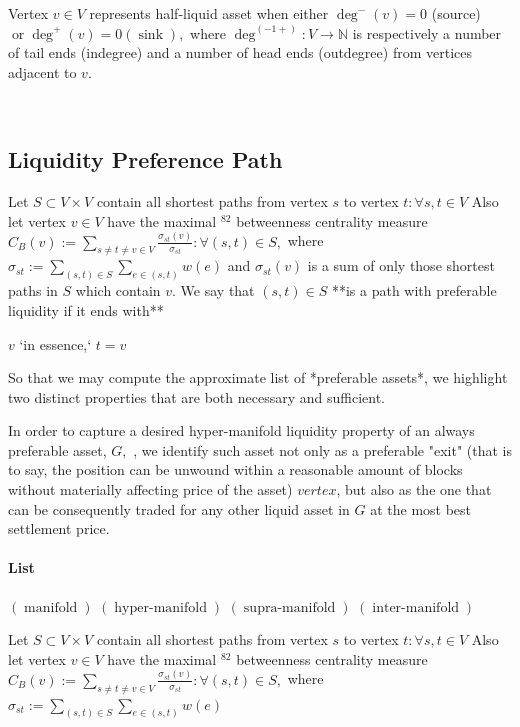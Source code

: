 {{{Vertex $v \in V$ represents half-liquid asset  when either $\operatorname{deg}^{-}(v)=0$ (source) $\operatorname{or} \operatorname{deg}^{+}(v)=0(\operatorname{sink}),$ where $\operatorname{deg}^{(-1+)}: V \rightarrow \mathbb{N}$ is respectively a number
of tail ends (indegree) and a number of head ends (outdegree) from vertices adjacent to $v$.

\
\subsection{Liquidity Preference Path}

Let $S \subset V \times V$ contain all shortest paths from vertex $s$ to vertex $t: \forall s, t \in V$ Also let vertex $v \in V$ have the maximal $^{82}$ betweenness centrality measure $C_{B}(v):=\sum_{s \neq t \neq v \in V} \frac{\sigma_{s t}(v)}{\sigma_{s t}}: \forall(s, t) \in S,$ where $\sigma_{s t}:=\sum_{(s, t) \in S} \sum_{e \in(s, t)} w(e)$
and $\sigma_{s t}(v)$ 
is a sum of only those shortest paths in $S$ which contain $v .$ We say that $(s, t) \in S$ **is a path with preferable liquidity if it ends with** 

   $v$ `in essence,` $t=v$

So that we may compute the approximate list of *preferable assets*, we highlight two distinct properties that are both necessary and sufficient.

In order to capture a desired hyper-manifold liquidity property of an always preferable asset, $G,$ , we identify such asset not only as a preferable "exit" (that is to say, the position can be unwound within a reasonable amount of blocks without materially affecting price of the asset) $vertex$, but also as the one that can be consequently traded for any other liquid asset in $G$ at the most best settlement price.


\paragraph{List}

$(\operatorname{manifold})$
$(\operatorname{hyper-manifold})$
$(\operatorname{supra-manifold})$
$(\operatorname{inter-manifold})$


Let $S \subset V \times V$ contain all shortest paths from vertex $s$ to vertex $t: \forall s, t \in V$ Also let vertex $v \in V$ have the maximal $^{82}$ betweenness centrality measure $C_{B}(v):=\sum_{s \neq t \neq v \in V} \frac{\sigma_{s t}(v)}{\sigma_{s t}}: \forall(s, t) \in S,$ where $\sigma_{s t}:=\sum_{(s, t) \in S} \sum_{e \in(s, t)} w(e)$


}}}
